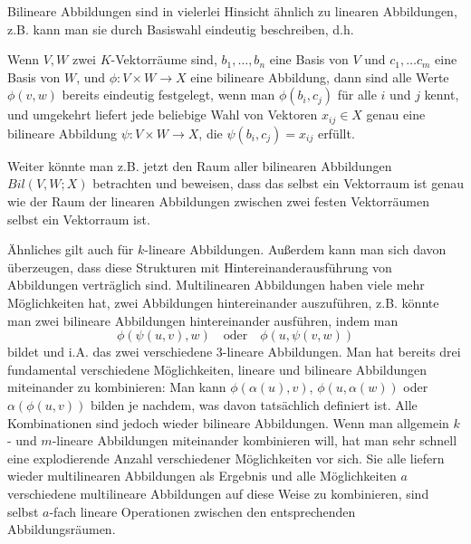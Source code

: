 \begin{remark}
Bilineare Abbildungen sind in vielerlei Hinsicht ähnlich zu linearen Abbildungen, z.B. kann man sie durch Basiswahl eindeutig beschreiben, d.h.

\medbreak
Wenn $V,W$ zwei $K$-Vektorräume sind, $b_1,\ldots,b_n$ eine Basis von $V$ und $c_1, \ldots c_m$ eine Basis von $W$, und $\phi: V\times W\to X$ eine bilineare Abbildung, dann sind alle Werte $\phi(v,w)$ bereits eindeutig festgelegt, wenn man $\phi(b_i,c_j)$ für alle $i$ und $j$ kennt, und umgekehrt liefert jede beliebige Wahl von Vektoren $x_{ij}\in X$ genau eine bilineare Abbildung $\psi: V\times W\to X$, die $\psi(b_i,c_j) = x_{ij}$ erfüllt.

\medbreak
Weiter könnte man z.B. jetzt den Raum aller bilinearen Abbildungen $Bil(V,W;X)$ betrachten und beweisen, dass das selbst ein Vektorraum ist genau wie der Raum der linearen Abbildungen zwischen zwei festen Vektorräumen selbst ein Vektorraum ist.

\medbreak
Ähnliches gilt auch für $k$-lineare Abbildungen. Außerdem kann man sich davon überzeugen, dass diese Strukturen mit Hintereinanderausführung von Abbildungen verträglich sind. Multilinearen Abbildungen haben viele mehr Möglichkeiten hat, zwei Abbildungen hintereinander auszuführen, z.B. könnte man zwei bilineare Abbildungen hintereinander ausführen, indem man
\[\phi(\psi(u,v),w)\quad\text{oder}\quad \phi(u,\psi(v,w))\]
bildet und i.A. das zwei verschiedene $3$-lineare Abbildungen. Man hat bereits drei fundamental verschiedene Möglichkeiten, lineare und bilineare Abbildungen miteinander zu kombinieren: Man kann $\phi(\alpha(u),v)$, $\phi(u,\alpha(w))$ oder $\alpha(\phi(u,v))$ bilden je nachdem, was davon tatsächlich definiert ist. Alle Kombinationen sind jedoch wieder bilineare Abbildungen. Wenn man allgemein $k$- und $m$-lineare Abbildungen miteinander kombinieren will, hat man sehr schnell eine explodierende Anzahl verschiedener Möglichkeiten vor sich. Sie alle liefern wieder multilinearen Abbildungen als Ergebnis und alle Möglichkeiten $a$ verschiedene multilineare Abbildungen auf diese Weise zu kombinieren, sind selbst $a$-fach lineare Operationen zwischen den entsprechenden Abbildungsräumen.


\end{remark}

